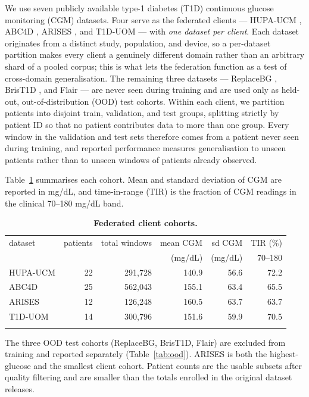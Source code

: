 \documentclass[10pt,letterpaper]{article}
\newlength\savedwidth
\newcommand\thickhline{\noalign{\global\savedwidth\arrayrulewidth\global\arrayrulewidth 2pt}%
\hline
\noalign{\global\arrayrulewidth\savedwidth}}
\begin{document}
We use seven publicly available type-1 diabetes (T1D) continuous glucose
monitoring (CGM) datasets. Four serve as the federated clients --- HUPA-UCM
\cite{hidalgo2024hupaucm}, ABC4D \cite{abc4d_nct}, ARISES \cite{zhu2022arises},
and T1D-UOM \cite{alsuhaymi2025t1duom} --- with \emph{one dataset per client}. Each dataset
originates from a distinct study, population, and device, so a per-dataset
partition makes every client a genuinely different domain rather than an
arbitrary shard of a pooled corpus; this is what lets the federation function as
a test of cross-domain generalisation. The remaining three datasets ---
ReplaceBG \cite{aleppo2017replacebg}, BrisT1D \cite{james2025brist1d}, and Flair
\cite{jaeb_flair} --- are never seen
during training and are used only as held-out, out-of-distribution (OOD) test
cohorts. Within
each client, we partition patients
into disjoint train, validation, and test groups, splitting strictly by
patient ID so that no patient contributes data to more than one group. Every
window in the validation and test sets therefore comes from a patient never
seen during training, and reported performance measures generalisation to
unseen patients rather than to unseen windows of patients already observed.

Table~\ref{tab:datasets} summarises each cohort. Mean and standard deviation of
CGM are reported in mg/dL, and time-in-range (TIR) is the fraction of CGM
readings in the clinical 70--180 mg/dL band.

\begin{table}[!ht]
\centering
\captionsetup{justification=centering,singlelinecheck=on}
\caption{\bf Federated client cohorts.}
\label{tab:datasets}
\begin{tabular}{lrrrrr}
\thickhline
dataset & patients & total windows & mean CGM & sd CGM & TIR (\%) \\
        &          &               & (mg/dL)  & (mg/dL) & 70--180  \\
\hline
HUPA-UCM & 22 & 291,728 & 140.9 & 56.6 & 72.2 \\
ABC4D    & 25 & 562,043 & 155.1 & 63.4 & 65.5 \\
ARISES   & 12 & 126,248 & 160.5 & 63.7 & 63.7 \\
T1D-UOM  & 14 & 300,796 & 151.6 & 59.9 & 70.5 \\
\thickhline
\end{tabular}
\begin{center}
{\small The three OOD test cohorts (ReplaceBG, BrisT1D, Flair) are excluded from
training and reported separately (Table~\ref{tab:ood}). ARISES is both the
highest-glucose and the smallest client cohort. Patient counts are the usable
subsets after quality filtering and are smaller than the totals enrolled in the
original dataset releases.}
\end{center}
\end{table}
\end{document}
